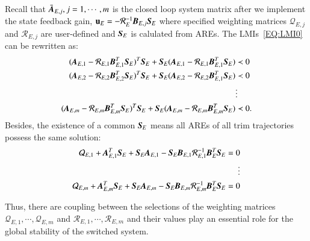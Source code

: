 Recall that $\bar{\emph{\textbf{A}}}_{E,j}, j=1, \cdots, m$ is the closed loop system matrix after we implement the state feedback gain, $\vec{u}_{E}=-\mathcal{R}_{E}^{-1}\emph{\textbf{B}}_{E,j}\emph{\textbf{S}}_{E}$
where specified weighting matrices $\mathcal{Q}_{E,j}$ and $\mathcal{R}_{E,j}$ are user-defined and $\emph{\textbf{S}}_{E}$ is calulated from AREs. The LMIs~\ref{EQ:LMI0} can be rewritten as:
\begin{align}
(\emph{\textbf{A}}_{E,1}-
\mathcal{R}_{E,1}\emph{\textbf{B}}^{T}_{E,1}
\emph{\textbf{S}}_{E})^{T}\emph{\textbf{S}}_{E}
+\emph{\textbf{S}}_{E}(\emph{\textbf{A}}_{E,1}-
\mathcal{R}_{E,1}\emph{\textbf{B}}^{T}_{E,1}
\emph{\textbf{S}}_{E}) &\prec 0 \nonumber \\
(\emph{\textbf{A}}_{E,2}-
\mathcal{R}_{E,2}\emph{\textbf{B}}^{T}_{E,2}
\emph{\textbf{S}}_{E})^{T}\emph{\textbf{S}}_{E}
+\emph{\textbf{S}}_{E}(\emph{\textbf{A}}_{E,2}-
\mathcal{R}_{E,2}\emph{\textbf{B}}^{T}_{E,1}
\emph{\textbf{S}}_{E}) &\prec 0 \nonumber \\
& \vdots \nonumber \\
(\emph{\textbf{A}}_{E,m}-
\mathcal{R}_{E,m}\emph{\textbf{B}}^{T}_{E,m}
\emph{\textbf{S}}_{E})^{T}\emph{\textbf{S}}_{E}
+\emph{\textbf{S}}_{E}(\emph{\textbf{A}}_{E,m}-
\mathcal{R}_{E,m}\emph{\textbf{B}}^{T}_{E,m}
\emph{\textbf{S}}_{E}) & \prec 0.
\label{EQ:LMI4}
\end{align} 
Besides, the existence of a common $\emph{\textbf{S}}_{E}$ means all AREs of all trim trajectories possess the same solution:
\begin{align}
\mathcal{Q}_{E,1}+\emph{\textbf{A}}_{E,1}^{T}\emph{\textbf{S}}_{E}
+\emph{\textbf{S}}_{E}\emph{\textbf{A}}_{E,1}
-\emph{\textbf{S}}_{E}\emph{\textbf{B}}_{E,1}\mathcal{R}_{E,1}^{-1}
\emph{\textbf{B}}_{E}^{T}\emph{\textbf{S}}_{E}=0 \nonumber \\
\vdots \nonumber \\
\mathcal{Q}_{E,m}+\emph{\textbf{A}}_{E,m}^{T}\emph{\textbf{S}}_{E}
+\emph{\textbf{S}}_{E}\emph{\textbf{A}}_{E,m}
-\emph{\textbf{S}}_{E}\emph{\textbf{B}}_{E,m}\mathcal{R}_{E,m}^{-1}
\emph{\textbf{B}}_{E}^{T}\emph{\textbf{S}}_{E}=0\label{EQ:LMI5}
\end{align} 

Thus, there are coupling between the selections of the weighting matrices $\mathcal{Q}_{E,1}, \cdots, \mathcal{Q}_{E,m}$ and $\mathcal{R}_{E,1}, \cdots, \mathcal{R}_{E,m}$ and their values play an essential role for the global stability of the switched system.

